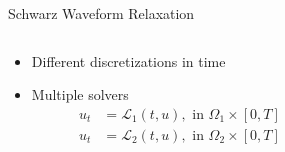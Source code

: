\documentclass[]{beamer}
\begin{document}
\begin{frame}{Schwarz Waveform Relaxation}

  \begin{columns}

    \begin{column}{.4\textwidth}

      \begin{itemize}
      \item<+-> Different discretizations in time
      \item<+-> Multiple solvers
        \begin{align*}
          u_t &=  \mathcal{L}_1(t,u), \text{ in } \Omega_1\times[0,T]\\
          u_t &=  \mathcal{L}_2(t,u), \text{ in } \Omega_2\times[0,T]\\
        \end{align*}
      \end{itemize}
      
    \end{column}

    \begin{column}{.6\textwidth}

      \begin{figure}
        \centering
      \end{figure}

    \end{column}
  \end{columns}
\end{frame}


  
\end{document}
